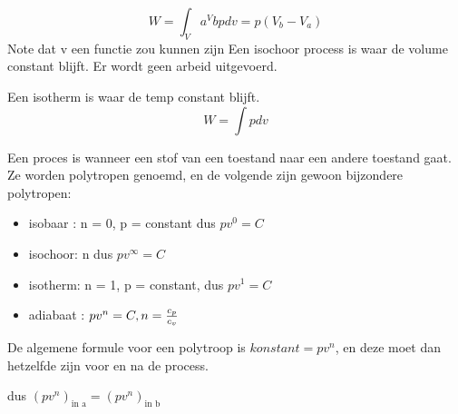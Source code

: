 \documentclass[12pt]{extarticle} %
\begin{document}
 $$
 W = \int_Va^Vb p dv = p(V_b-V_a)
 $$
 Note dat v een functie zou kunnen zijn
 Een isochoor process is waar de volume constant blijft.
 Er wordt geen arbeid uitgevoerd.

 Een isotherm is waar de temp constant blijft. 
$$
W = \int p dv
$$

Een proces is wanneer een stof van een toestand naar een andere toestand gaat. Ze worden polytropen genoemd, 
en de volgende zijn gewoon bijzondere polytropen:
\begin{itemize}
    \item isobaar : n = 0, p = constant dus $p v^0 = C$
    \item isochoor: n  dus $p v^\infty = C$
    \item isotherm: n = 1, p = constant, dus $p v^1 = C$
    \item adiabaat : $p v^n = C, n = {c_p \over c_v}$
\end{itemize}
De algemene formule voor een polytroop is $konstant = p v^n$, en deze moet dan hetzelfde zijn voor en na de process.

dus $(p v^n)_{\text{in a}} = (p v^n)_{\text{in b}}$
\end{document}
